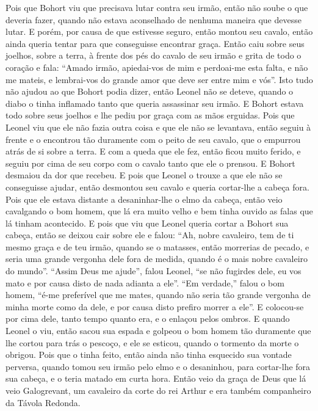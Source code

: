 Pois que Bohort viu que precisava lutar contra seu irmão, então não soube o que
deveria fazer, quando não estava aconselhado de nenhuma maneira que devesse
lutar. E porém, por causa de que estivesse seguro, então montou seu cavalo,
então ainda queria tentar para que conseguisse encontrar graça. Então caiu
sobre seus joelhos, sobre a terra, à frente dos pés do cavalo de seu irmão e
grita de todo o coração e fala: “Amado irmão, apiedai-vos de mim e perdoai-me
esta falta, e não me mateis, e lembrai-vos do grande amor que deve ser entre
mim e vós”. Isto tudo não ajudou ao que Bohort podia dizer, então Leonel não se
deteve, quando o diabo o tinha inflamado tanto que queria assassinar seu irmão. 
E Bohort estava todo sobre seus joelhos e lhe pediu por graça com as
mãos erguidas. Pois que Leonel viu que ele não fazia outra coisa e que
ele não se levantava, então seguiu à frente e o encontrou tão duramente com o
peito de seu cavalo, que o empurrou atrás de si sobre a terra. E com a queda
que ele fez, então ficou muito ferido, e seguiu por cima de seu corpo com o
cavalo tanto que ele o prensou. E Bohort desmaiou da dor que recebeu. E pois
que Leonel o trouxe a que ele não se conseguisse ajudar, então desmontou seu
cavalo e queria cortar-lhe a cabeça fora. Pois que ele estava distante a
desaninhar-lhe o elmo da cabeça, então veio cavalgando o bom homem, que lá era
muito velho e bem tinha ouvido as falas que lá tinham acontecido. E pois que
viu que Leonel queria cortar a Bohort sua cabeça, então se deixou cair sobre
ele e falou: “Ah, nobre cavaleiro, tem de ti mesmo graça e de teu irmão, quando
se o matasses, então morrerias de pecado, e seria uma grande vergonha dele fora
de medida, quando é o mais nobre cavaleiro do mundo”. “Assim Deus me
ajude”, falou Leonel, “se não fugirdes dele, eu vos mato e por causa disto de
nada adianta a ele”. “Em verdade,” falou o bom homem, “é-me preferível que me
mates, quando não seria tão grande vergonha de minha morte como da dele, e por
causa disto prefiro morrer a ele”. E colocou-se por cima dele, tanto tempo
quanto era, e o enlaçou pelos ombros. E quando Leonel o viu, então sacou sua
espada e golpeou o bom homem tão duramente que lhe cortou para trás o pescoço,
e ele se esticou, quando o tormento da morte o obrigou. Pois que o tinha feito,
então ainda não tinha esquecido sua vontade perversa, quando tomou seu irmão
pelo elmo e o desaninhou, para cortar-lhe fora sua cabeça, e o teria matado em
curta hora. Então veio da graça de Deus que lá veio Galogrevant, um cavaleiro
da corte do rei Arthur e era também companheiro da Távola Redonda.
